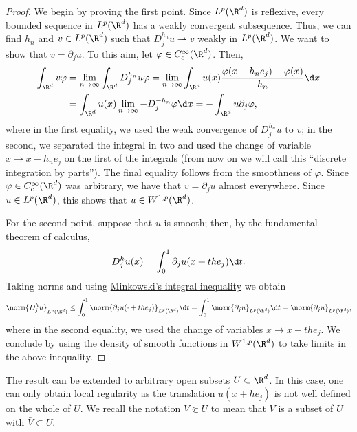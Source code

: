 \documentclass[
    a4paper,
    DIV=14,
    abstract=true,
    numbers=noenddot
]{scrartcl}
\begin{document}
\begin{proof}
    We begin by proving the first point. Since $L^p(\R^d)$ is reflexive, every bounded sequence in $L^p(\R^d)$ has a weakly convergent subsequence. Thus, we can find $h_n$ and $v \in L^p(\R^d)$ such that $D_j^{h_n} u \rightharpoonup v$ weakly in $L^p(\R^d)$. We want to show that $v = \partial_j u$. To this aim, let $\varphi \in C_c^\infty(\R^d)$. Then,
    \begin{align}\label{weak int parts}
        \int_{\R^d} v \varphi & = \lim_{n \to \infty} \int_{\R^d} D_j^{h_n} u \varphi = \lim_{n \to \infty} \int_{\R^d} u(x)\frac{\varphi(x-h_n e_j)- \varphi (x)}{h_n}\d x
        \\&= \int_{\R^d} u(x)\lim_{n \to \infty} -D_j^{-h_n} \varphi \d x =-\int_{\R^d} u \partial_j \varphi,\notag
    \end{align}
    where in the first equality, we used the weak convergence of $D_j^{h_n}u$ to $v$; in the second, we separated the integral in two and used the change of variable $x \to x-h_n e_j$ on the first of the integrals (from now on we will call this ``discrete integration by parts''). The final equality follows from the smoothness of $\varphi$. Since $\varphi \in C_c^\infty(\R^d)$ was arbitrary, we have that $v=\partial_j u$ almost everywhere. Since $u \in L^p(\R^d)$, this shows that $u \in W^{1,p}(\R^d)$.

    For the second point, suppose that $u$ is smooth; then, by the fundamental theorem of calculus,
    \begin{align*}
        D_j^h u(x) = \int_0^1 \partial_j u(x+the_j) \d t.
    \end{align*}
    Taking norms and using \href{https://en.wikipedia.org/wiki/Minkowski_inequality#:~:text=.-,Minkowski%27s,-integral%20inequality%5B}{Minkowski's integral inequality} we obtain
    \begin{align*}
        \norm{D_j^h u}_{L^p(\R^d)} \leq \int_0^1 \norm{\partial_j u(\cdot+the_j)}_{L^p(\R^d)} \d t= \int_{0}^1 \norm{\partial_j u}_{L^p(\R^d)} \d t=\norm{\partial_j u}_{L^p(\R^d)},
    \end{align*}
    where in the second equality, we used the change of variables $x \to x-the_j$. We conclude by using the density of smooth functions in $W^{1,p}(\R^d)$ to take limits in the above inequality.
\end{proof}
The result can be extended to arbitrary open subsets $U \subset \R^d$. In this case, one can only obtain local regularity as the translation $u(x+h e_j)$ is not well defined on the whole of $U$. We recall the notation $V \Subset U$ to mean that $V$ is a subset of $U$ with   $\bar{V} \subset U$.
\end{document}
